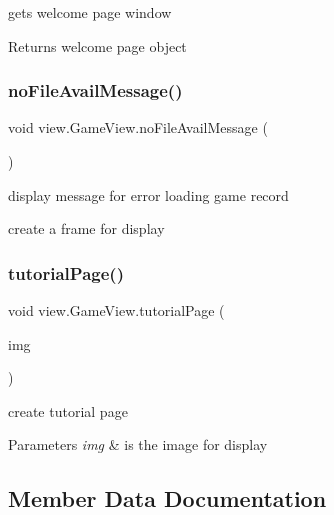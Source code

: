 gets welcome page window 

\begin{DoxyReturn}{Returns}
welcome page object 
\end{DoxyReturn}
\hypertarget{classview_1_1_game_view_a7320789eb48e8b661a1f3a522ef592fb}{}\label{classview_1_1_game_view_a7320789eb48e8b661a1f3a522ef592fb} 
\subsubsection{\texorpdfstring{no\+File\+Avail\+Message()}{noFileAvailMessage()}}
{\footnotesize\ttfamily void view.\+Game\+View.\+no\+File\+Avail\+Message (\begin{DoxyParamCaption}{ }\end{DoxyParamCaption})}



display message for error loading game record 

create a frame for display \hypertarget{classview_1_1_game_view_a67fd4999f1be51ce360b8bba68e87d9c}{}\label{classview_1_1_game_view_a67fd4999f1be51ce360b8bba68e87d9c} 
\subsubsection{\texorpdfstring{tutorial\+Page()}{tutorialPage()}}
{\footnotesize\ttfamily void view.\+Game\+View.\+tutorial\+Page (\begin{DoxyParamCaption}\item[{Image\+Icon}]{img }\end{DoxyParamCaption})}



create tutorial page 


\begin{DoxyParams}{Parameters}
{\em img} & is the image for display \\
\hline
\end{DoxyParams}


\subsection{Member Data Documentation}
\hypertarget{classview_1_1_game_view_a4883525ad5307e9ac642854eb6db66d1}{}\label{classview_1_1_game_view_a4883525ad5307e9ac642854eb6db66d1} 
